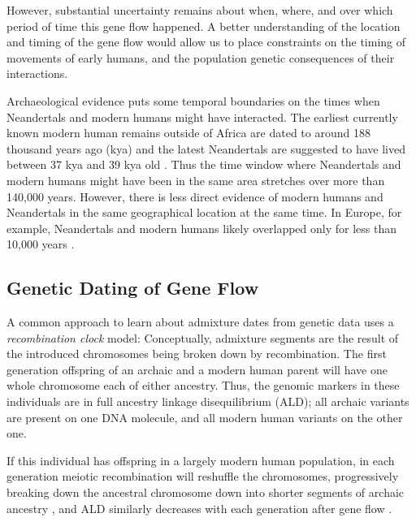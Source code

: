 \documentclass[11pt]{article}
\begin{document}
However, substantial uncertainty remains about when, where, and over which period of time this gene flow happened. A better understanding of the location and timing of the gene flow would allow us to place constraints on the timing of movements of early humans, and the population genetic consequences of their interactions.

Archaeological evidence puts some temporal boundaries on the times when Neandertals and modern humans might have interacted. The earliest currently known modern human remains outside of Africa are dated to around 188 thousand years ago (kya)  \citep{hershkovitz_earliest_2018,stringer_when_2018} and the latest Neandertals are suggested to have lived between 37 kya and 39 kya old \citep{higham_timing_2014,zilhao_precise_2017}. Thus the time window where Neandertals and modern humans might have been in the same area stretches over more than 140,000 years. However, there is less direct evidence of modern humans and Neandertals in the same geographical location at the same time. In Europe, for example, Neandertals and modern humans likely overlapped only for less than 10,000 years \citep{bard_extended_2020}. 

\subsection{Genetic Dating of Gene Flow}\label{Admixture models}

A common approach to learn about admixture dates from genetic data uses a \emph{recombination clock} model: Conceptually, admixture segments are the result of the introduced chromosomes being broken down by recombination. The first generation offspring of an archaic and a modern human parent will have one whole chromosome each of either ancestry. Thus, the genomic markers in these individuals are in full ancestry linkage disequilibrium (ALD); all archaic variants are present on one DNA molecule, and all modern human variants on the other one.

If this individual has offspring in a largely modern human population, in each generation meiotic recombination will reshuffle the chromosomes, progressively breaking down the ancestral chromosome down into shorter segments of archaic ancestry \citep{falush_inference_2003, gravel_population_2012,liang_lengths_2014}, and ALD similarly decreases with each generation after gene flow \citep{chakraborty_admixture_1988,stephens_mapping_1994,wall_detecting_2000}.
\end{document}
